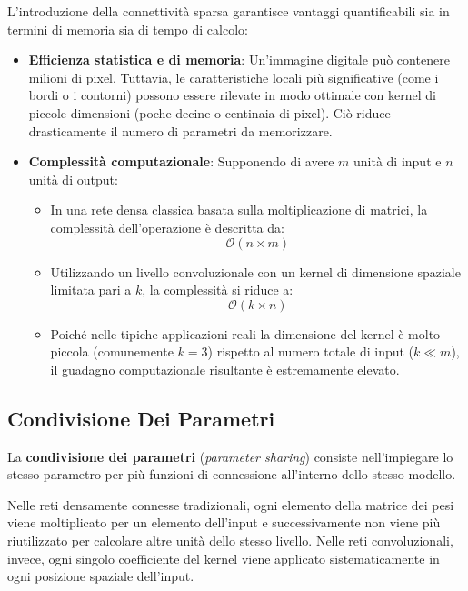 ﻿\documentclass[11pt, a4paper]{article}
\begin{document}
L'introduzione della connettività sparsa garantisce vantaggi quantificabili sia in termini di memoria sia di tempo di calcolo:
\begin{itemize}
    \item \textbf{Efficienza statistica e di memoria}: Un'immagine digitale può contenere milioni di pixel. Tuttavia, le caratteristiche locali più significative (come i bordi o i contorni) possono essere rilevate in modo ottimale con kernel di piccole dimensioni (poche decine o centinaia di pixel). Ciò riduce drasticamente il numero di parametri da memorizzare.
    \item \textbf{Complessità computazionale}: Supponendo di avere $m$ unità di input e $n$ unità di output:
    \begin{itemize}
        \item In una rete densa classica basata sulla moltiplicazione di matrici, la complessità dell'operazione è descritta da:
        \[
        \mathcal{O}(n \times m)
        \]
        \item Utilizzando un livello convoluzionale con un kernel di dimensione spaziale limitata pari a $k$, la complessità si riduce a:
        \[
        \mathcal{O}(k \times n)
        \]
        \item Poiché nelle tipiche applicazioni reali la dimensione del kernel è molto piccola (comunemente $k = 3$) rispetto al numero totale di input ($k \ll m$), il guadagno computazionale risultante è estremamente elevato.
    \end{itemize}
\end{itemize}

\subsection{Condivisione Dei Parametri}

La \textbf{condivisione dei parametri} (\emph{parameter sharing}) consiste nell'impiegare lo stesso parametro per più funzioni di connessione all'interno dello stesso modello.

Nelle reti densamente connesse tradizionali, ogni elemento della matrice dei pesi viene moltiplicato per un elemento dell'input e successivamente non viene più riutilizzato per calcolare altre unità dello stesso livello. Nelle reti convoluzionali, invece, ogni singolo coefficiente del kernel viene applicato sistematicamente in ogni posizione spaziale dell'input.

\end{document}
